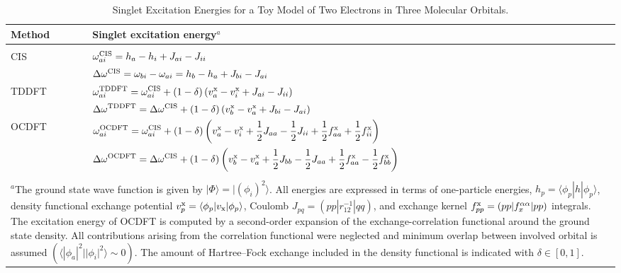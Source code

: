 \documentclass{article}
\begin{document}
\begin{table}[t!]
	\caption{Singlet Excitation Energies for a Toy Model of Two Electrons in Three Molecular Orbitals.}
	\begin{tabular}{ll}
		\toprule
Method & Singlet excitation energy$^{a}$ \\
\midrule\\[-8pt]
CIS &   
 $\omega_{ai}^{\rm{CIS}} = h_a - h_i + J_{ai}-J_{ii}$ \\[6pt]
&$ \Delta \omega^{\rm{CIS}}= \omega_{bi} - \omega_{ai} = h_b-h_a  + J_{bi}- J_{ai}$ \\
\midrule
TDDFT 
&$\displaystyle\omega_{ai}^{\rm{TDDFT}} = \omega_{ai}^{\text{CIS}} 
+ (1-\delta) \left(v^{\text{x}}_{a} - v^{\text{x}}_{i} + J_{ai} -  J_{ii} \right)$\\[6pt] 
&$\displaystyle\Delta \omega^{\rm{TDDFT}} = \Delta\omega^{\text{CIS}} + (1-\delta) \left(v^{\text{x}}_{b}
-v^{\text{x}}_{a} + J_{bi} -  J_{ai}\right)$\\  
 \midrule
OCDFT 
& $\displaystyle\omega_{ai}^{\rm{OCDFT}}  = \omega^{\text{CIS}}_{ai} + (1-\delta)\left(v^{\text{x}}_{a}
  -v^{\text{x}}_{i} + \frac{1}{2} J_{aa} - \frac{1}{2} J_{ii}  
  +  \frac{1}{2} f^{\rm x}_{aa} +  \frac{1}{2} f^{\rm x}_{ii} \right)$\\[12pt] 
&$\displaystyle\Delta \omega^{\text{OCDFT}} = \Delta\omega^{\text{CIS}} +
(1-\delta)\left(v^{\text{x}}_{b}
-v^{\text{x}}_{a} + \frac{1}{2}J_{bb} -  \frac{1}{2} J_{aa}
+  \frac{1}{2} f^{\rm x}_{aa}- \frac{1}{2} f^{\rm x}_{bb}\right)$ \\
\bottomrule\\
\multicolumn{2}{l}{
\begin{minipage}{5in}%
\small
{$^a$}The ground state wave function is given by $|\Phi \rangle = | (\phi_i)^2\rangle$. All energies are expressed in terms of one-particle energies, $h_p=\langle\phi_p|\hat{h}|\phi_p\rangle$, density functional exchange potential $v^{\text x}_p = \langle \phi_p|v_{\text{x}}|\phi_p\rangle$, Coulomb $J_{pq}=(pp|r_{12}^{-1}|qq)$, and exchange kernel $f^{\rm x}_{pp} = (pp|f^{\alpha\alpha}_x|pp)$ integrals. The excitation energy of OCDFT is computed by a second-order expansion of the exchange-correlation functional around the ground state density. All contributions arising  from the correlation functional were neglected and minimum overlap between involved orbital is assumed $(\langle|\phi_a|^2 ||\phi_i|^2\rangle\sim 0 )$. The amount of Hartree--Fock exchange included in the density functional is indicated with $\delta \in [0,1]$.
\end{minipage}%
}
\end{tabular} \\

	\label{table:OCDFT-CIS-TDDFT}
\end{table}
\end{document}
